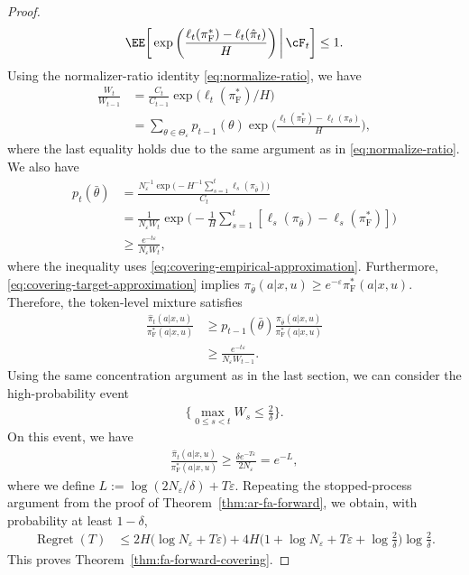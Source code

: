 \documentclass[11pt]{article}
\newcommand{\pif}{\pi_{\mathrm{F}}}
\begin{document}
\begin{proof}
\begin{align}
    \EE\bigg[
        \exp\bigg(
            \frac{\ell_t(\pif^*)-\ell_t(\hat\pi_t)}H
        \bigg)
        \,\bigg|\,\cF_t
    \bigg]
    \leq1.
    \label{eq:covering-central}
\end{align}
Using the normalizer-ratio identity
\eqref{eq:normalize-ratio}, we have
\begin{align*}
    \frac{W_t}{W_{t-1}}
    &=
    \frac{C_t}{C_{t-1}}
    \exp\bigl(\ell_t(\pif^*)/H\bigr)\\
    &=
    \sum_{\theta\in\Theta_\varepsilon}
    p_{t-1}(\theta)
    \exp\bigg(
        \frac{\ell_t(\pif^*)-\ell_t(\pi_\theta)}H
    \bigg),
\end{align*}
where the last equality holds due to the same argument as in \eqref{eq:normalize-ratio}.
We also have
\begin{align*}
    p_t(\bar\theta)
    &=
    \frac{
        N_\varepsilon^{-1}
        \exp\big(
            -H^{-1}\sum_{s=1}^t\ell_s(\pi_{\bar\theta})
        \big)
    }{C_t}\\
    &=
    \frac1{N_\varepsilon W_t}
    \exp\bigg(
        -\frac1H\sum_{s=1}^t
        [\ell_s(\pi_{\bar\theta})-\ell_s(\pif^*)]
    \bigg)\\
    &\geq
    \frac{e^{-t\varepsilon}}{N_\varepsilon W_t},
\end{align*}
where the inequality uses
\eqref{eq:covering-empirical-approximation}.
Furthermore, \eqref{eq:covering-target-approximation} implies
$\pi_{\bar\theta}(a|x,u)\geq
e^{-\varepsilon}\pif^*(a|x,u)$.
Therefore, the token-level mixture satisfies
\begin{align*}
    \frac{\hat\pi_t(a|x,u)}{\pif^*(a|x,u)}
    &\geq
    p_{t-1}(\bar\theta)
    \frac{\pi_{\bar\theta}(a|x,u)}{\pif^*(a|x,u)}\\
    &\geq
    \frac{e^{-t\varepsilon}}
         {N_\varepsilon W_{t-1}}.
\end{align*}
Using the same concentration argument as in the last section, we can consider the high-probability event
\begin{align*}
    \bigg\{\max_{0\leq s<t}W_s\leq\frac2\delta\bigg\}.
\end{align*}
On this event, we have
\begin{align*}
    \frac{\hat\pi_t(a|x,u)}{\pif^*(a|x,u)}
    \geq
    \frac{\delta e^{-T\varepsilon}}{2N_\varepsilon}
    =
    e^{-L},
\end{align*}
where we define $L:=\log({2N_\varepsilon}/{\delta})+T\varepsilon$.
Repeating the stopped-process argument from the proof of Theorem~\ref{thm:ar-fa-forward}, we obtain, with probability at least $1-\delta$,
\begin{align*}
    \operatorname{Regret}(T)
    &\leq
    2H\bigl(\log N_\varepsilon+T\varepsilon\bigr)+
    4H\bigg(
        1+\log N_\varepsilon+T\varepsilon
        +\log\frac2\delta
    \bigg)\log\frac2\delta.
\end{align*}
This proves Theorem~\ref{thm:fa-forward-covering}.
\end{proof}
\end{document}
